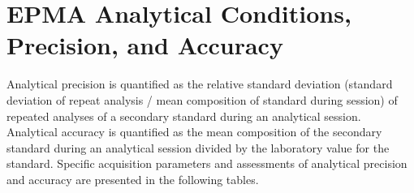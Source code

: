 \chapter{EPMA Analytical Conditions, Precision, and Accuracy} 
\label{supplement:a}
\hspace{\parindent} Analytical precision is quantified as the relative standard deviation (standard deviation of repeat analysis / mean composition of standard during session) of repeated analyses of a secondary standard during an analytical session. Analytical accuracy is quantified as the mean composition of the secondary standard during an analytical session divided by the laboratory value for the standard. Specific acquisition parameters and assessments of analytical precision and accuracy are presented in the following tables. 

